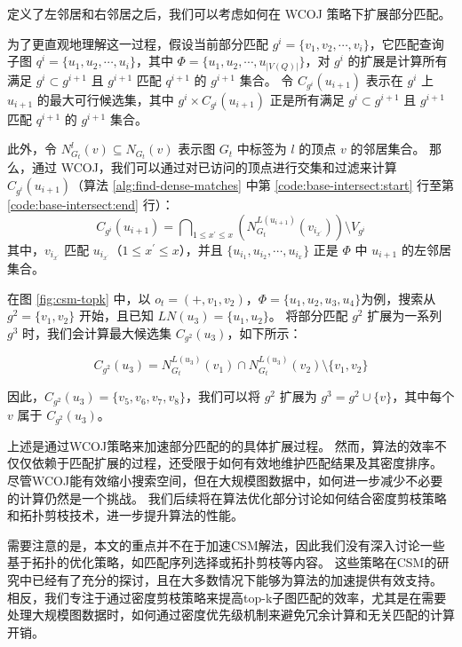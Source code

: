 定义了左邻居和右邻居之后，我们可以考虑如何在 WCOJ 策略下扩展部分匹配。

为了更直观地理解这一过程，假设当前部分匹配 $g^i = \{v_1, v_2, \cdots, v_i\}$，它匹配查询子图 $q^i = \{u_1, u_2, \cdots, u_i\}$，其中 $\Phi = \{u_1, u_2, \cdots, u_{|V(Q)|}\}$，对 $g^i$ 的扩展是计算所有满足 $g^i \subset g^{i+1}$ 且 $g^{i+1}$ 匹配 $q^{i+1}$ 的 $g^{i+1}$ 集合。
令 $C_{g^{i}}(u_{i+1})$ 表示在 $g^i$ 上 $u_{i+1}$ 的最大可行候选集，其中 $g^i \times C_{g^{i}}(u_{i+1})$ 正是所有满足 $g^i \subset g^{i+1}$ 且 $g^{i+1}$ 匹配 $q^{i+1}$ 的 $g^{i+1}$ 集合。

此外，令 $N_{G_t}^l(v) \subseteq N_{G_t}(v)$ 表示图 $G_t$ 中标签为 $l$ 的顶点 $v$ 的邻居集合。
那么，通过 WCOJ，我们可以通过对已访问的顶点进行交集和过滤来计算 $C_{g^{i}}(u_{i+1})$（算法 \ref{alg:find-dense-matches} 中第 \ref{code:base-intersect:start} 行至第 \ref{code:base-intersect:end} 行）：
\begin{equation} \label{equation:wcoj-intersection}
    C_{g^{i}}(u_{i+1}) = \bigcap\nolimits_{1\leq x^\prime\leq x} \left(  N_{G_t}^{L(u_{i+1})}(v_{i_{x^\prime}}) \right)  \setminus V_{g^i}
\end{equation}
其中，$v_{i_{x^\prime}}$ 匹配 $u_{i_{x^\prime}}$（$1 \leq x^\prime \leq x$），并且 $\{u_{i_1}, u_{i_2}, \cdots, u_{i_x}\}$ 正是 $\Phi$ 中 $u_{i+1}$ 的左邻居集合。

在图 \ref{fig:csm-topk} 中，以 $o_t = (+,v_1,v_2)$，$\Phi = \{u_1,u_2,u_3,u_4\}$为例，搜索从 $g^2 = \{v_1,v_2\}$ 开始，且已知 $LN(u_3) = \{u_1, u_2\}$。
将部分匹配 $g^2$ 扩展为一系列 $g^3$ 时，我们会计算最大候选集 $C_{g^{2}}(u_3)$，如下所示：

\[
	C_{g^{2}}(u_{3}) =  N_{G_t}^{L(u_{3})}(v_{1})\cap N_{G_t}^{L(u_{3})}(v_{2})  \setminus \{v_1, v_2\}
\]

因此，$C_{g^{2}}(u_3) = \{v_5, v_6, v_7, v_8\}$，我们可以将 $g^2$ 扩展为 $g^3 = g^2 \cup \{v\}$，其中每个 $v$ 属于 $C_{g^{2}}(u_3)$。

上述是通过WCOJ策略来加速部分匹配的的具体扩展过程。
然而，算法的效率不仅仅依赖于匹配扩展的过程，还受限于如何有效地维护匹配结果及其密度排序。
尽管WCOJ能有效缩小搜索空间，但在大规模图数据中，如何进一步减少不必要的计算仍然是一个挑战。
我们后续将在算法优化部分讨论如何结合密度剪枝策略和拓扑剪枝技术，进一步提升算法的性能。

需要注意的是，本文的重点并不在于加速CSM解法，因此我们没有深入讨论一些基于拓扑的优化策略，如匹配序列选择或拓扑剪枝等内容。
这些策略在CSM的研究中已经有了充分的探讨，且在大多数情况下能够为算法的加速提供有效支持。
相反，我们专注于通过密度剪枝策略来提高top-k子图匹配的效率，尤其是在需要处理大规模图数据时，如何通过密度优先级机制来避免冗余计算和无关匹配的计算开销。



